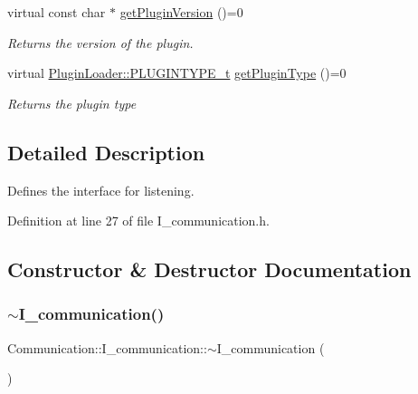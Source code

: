 \begin{DoxyCompactItemize}
virtual const char $\ast$ \mbox{\hyperlink{classCommunication_1_1I__communication_a3ff1f75536d5a7394ef736353bd29e53}{get\+Plugin\+Version}} ()=0
\begin{DoxyCompactList}\small\item\em Returns the version of the plugin. \end{DoxyCompactList}\item 
virtual \mbox{\hyperlink{namespacePluginLoader_a7b1358e9577b47b5d4b16231a5a81699}{Plugin\+Loader\+::\+P\+L\+U\+G\+I\+N\+T\+Y\+P\+E\+\_\+t}} \mbox{\hyperlink{classCommunication_1_1I__communication_a531577d9a13f3fcb566a350b74184823}{get\+Plugin\+Type}} ()=0
\begin{DoxyCompactList}\small\item\em Returns the plugin {\itshape type} \end{DoxyCompactList}\end{DoxyCompactItemize}


\subsection{Detailed Description}
Defines the interface for listening. 

Definition at line 27 of file I\+\_\+communication.\+h.



\subsection{Constructor \& Destructor Documentation}
\mbox{\label{classCommunication_1_1I__communication_a99bb16b4f894003f22b1b1cfecd95217}} 
\subsubsection{\texorpdfstring{$\sim$I\_communication()}{~I\_communication()}}
{\footnotesize\ttfamily Communication\+::\+I\+\_\+communication\+::$\sim$\+I\+\_\+communication (\begin{DoxyParamCaption}{ }\end{DoxyParamCaption})\hspace{0.3cm}{\ttfamily [default]}}

